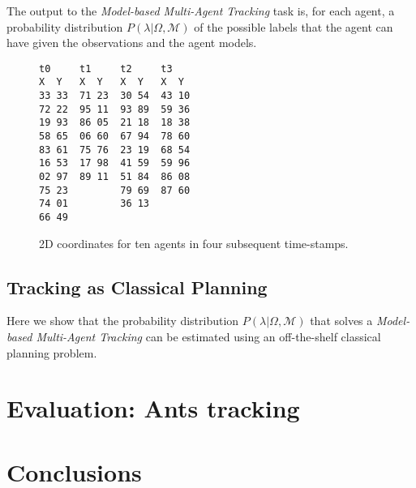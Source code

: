 \documentclass[letterpaper]{article} %
\begin{document}
The output to the {\em Model-based Multi-Agent Tracking} task is, for each agent, a probability distribution $P(\lambda|\Omega,\mathcal{M})$ of the possible labels that the agent can have given the observations and the agent models.


\begin{figure}
\begin{scriptsize}
\begin{verbatim}
t0     t1     t2     t3
X  Y   X  Y   X  Y   X  Y
33 33  71 23  30 54  43 10
72 22  95 11  93 89  59 36
19 93  86 05  21 18  18 38
58 65  06 60  67 94  78 60
83 61  75 76  23 19  68 54
16 53  17 98  41 59  59 96
02 97  89 11  51 84  86 08
75 23         79 69  87 60
74 01         36 13
66 49
\end{verbatim}
\end{scriptsize}
 \caption{\small 2D coordinates for ten agents in four subsequent time-stamps.}
\label{fig:observation}
\end{figure}





\subsection{Tracking as Classical Planning}
Here we show that the probability distribution $P(\lambda|\Omega,\mathcal{M})$ that solves a {\em Model-based Multi-Agent Tracking} can be estimated using an off-the-shelf classical planning problem.



\section{Evaluation: Ants tracking}
\label{sec:evaluation}




\section{Conclusions}
\label{sec:conclusions}



\end{document}
